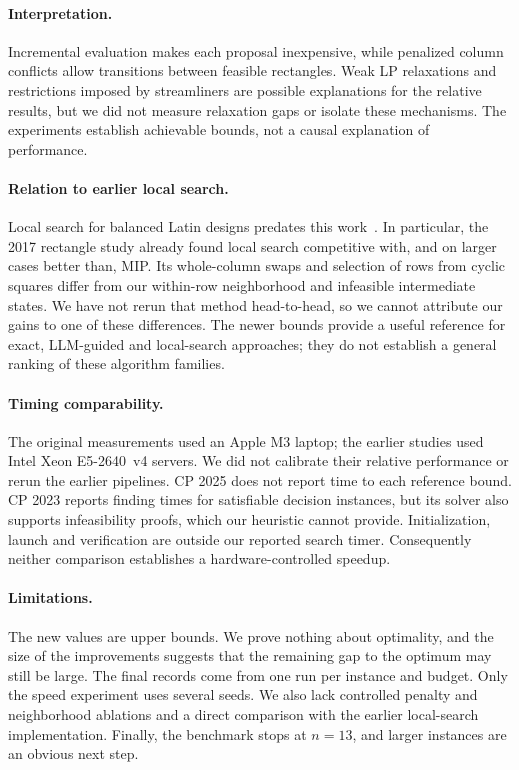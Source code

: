 \documentclass[11pt]{article}
\begin{document}
\paragraph{Interpretation.} Incremental evaluation makes each proposal inexpensive, while
penalized column conflicts allow transitions between feasible rectangles. Weak LP
relaxations and restrictions imposed by streamliners are possible explanations for the
relative results, but we did not measure relaxation gaps or isolate these mechanisms.
The experiments establish achievable bounds, not a causal explanation of performance.

\paragraph{Relation to earlier local search.} Local search for balanced Latin designs
predates this work~\citep{SmithGomesFernandez2005,DiazLeBrasGomes2017}.
In particular, the 2017 rectangle study already found local search competitive with,
and on larger cases better than, MIP. Its whole-column swaps and selection of rows from
cyclic squares differ from our within-row neighborhood and infeasible intermediate
states. We have not rerun that method head-to-head, so we cannot attribute our gains
to one of these differences. The newer bounds provide a useful reference for exact,
LLM-guided and local-search approaches; they do not establish a general ranking of
these algorithm families.

\paragraph{Timing comparability.} The original measurements used an Apple M3 laptop;
the earlier studies used Intel Xeon E5-2640~v4 servers. We did not calibrate their
relative performance or rerun the earlier pipelines. CP 2025 does not report time to
each reference bound. CP 2023 reports finding times for satisfiable decision instances,
but its solver also supports infeasibility proofs, which our heuristic cannot provide.
Initialization, launch and verification are outside our reported search timer.
Consequently neither comparison establishes a hardware-controlled speedup.

\paragraph{Limitations.} The new values are upper bounds. We prove nothing about optimality, and
the size of the improvements suggests that the remaining gap to the optimum may still be large.
The final records come from one run per instance and budget. Only the speed experiment uses
several seeds. We also lack controlled penalty and neighborhood ablations and a direct comparison
with the earlier local-search implementation. Finally, the benchmark stops at $n=13$, and larger instances are an obvious next
step.
\end{document}
